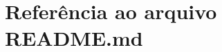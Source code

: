 \hypertarget{_r_e_a_d_m_e_8md}{}\section{Referência ao arquivo R\+E\+A\+D\+M\+E.\+md}
\label{_r_e_a_d_m_e_8md}
